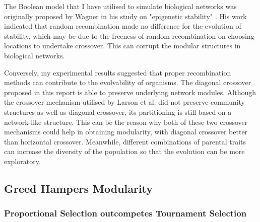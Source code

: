 The Boolean model that I have utilised to simulate biological networks was originally proposed by Wagner in his study on "epigenetic stability" \cite{wagner1996does}. His work indicated that random recombination made no difference for the evolution of stability, which may be due to the freeness of random recombination on choosing locations to undertake crossover. This can corrupt the modular structures in biological networks.

Conversely, my experimental results suggested that proper recombination methods can contribute to the evolvability of organisms. The diagonal crossover proposed in this report is able to preserve underlying network modules. Although the crossover mechanism utilised by Larson et al. did not preserve community structures as well as diagonal crossover, its partitioning is still based on a network-like structure. This can be the reason why both of these two crossover mechanisms could help in obtaining modularity, with diagonal crossover better than horizontal crossover. Meanwhile, different combinations of parental traits can increase the diversity of the population so that the evolution can be more exploratory.

\subsection{Greed Hampers Modularity}
\subsubsection{Proportional Selection outcompetes Tournament Selection}